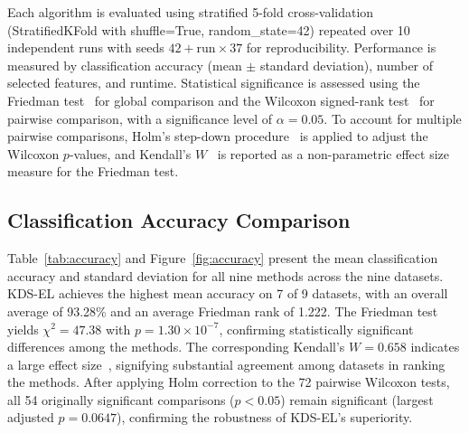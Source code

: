 \documentclass[a4paper,fleqn]{cas-dc}
\begin{document}
\begin{sloppypar}
	\par{
	Each algorithm is evaluated using stratified 5-fold cross-validation
	(StratifiedKFold with shuffle=True, random\_state=42) repeated over
	10 independent runs with seeds $42 + \text{run} \times 37$ for
	reproducibility.
	Performance is measured by classification accuracy (mean $\pm$
	standard deviation), number of selected features, and runtime.
	Statistical significance is assessed using the Friedman test~\citep{friedman1937use,demsar2006statistical} for
	global comparison and the Wilcoxon signed-rank test~\citep{wilcoxon1945individual} for pairwise
	comparison, with a significance level of $\alpha = 0.05$.
	To account for multiple pairwise comparisons, Holm's step-down
	procedure~\citep{holm1979simple} is applied to adjust the
	Wilcoxon $p$-values, and Kendall's $W$~\citep{kendall1939measures}
	is reported as a non-parametric effect size measure for the
	Friedman test.
	}

	\subsection{Classification Accuracy Comparison}
	\label{sec:experiments:accuracy}

	\par{
	Table~\ref{tab:accuracy} and Figure~\ref{fig:accuracy} present the
	mean classification accuracy and standard deviation for all nine
	methods across the nine datasets.
	KDS-EL achieves the highest mean accuracy on 7 of 9 datasets,
	with an overall average of 93.28\% and an average Friedman rank of
	1.222.
	The Friedman test yields $\chi^2 = 47.38$ with
	$p = 1.30 \times 10^{-7}$, confirming statistically significant
	differences among the methods.
	The corresponding Kendall's $W = 0.658$ indicates a large effect
	size~\citep{kendall1939measures}, signifying substantial agreement
	among datasets in ranking the methods.
	After applying Holm correction to the 72 pairwise Wilcoxon tests,
	all 54 originally significant comparisons ($p < 0.05$) remain
	significant (largest adjusted $p = 0.0647$), confirming the
	robustness of KDS-EL's superiority.
	}


\end{sloppypar}
\end{document}
